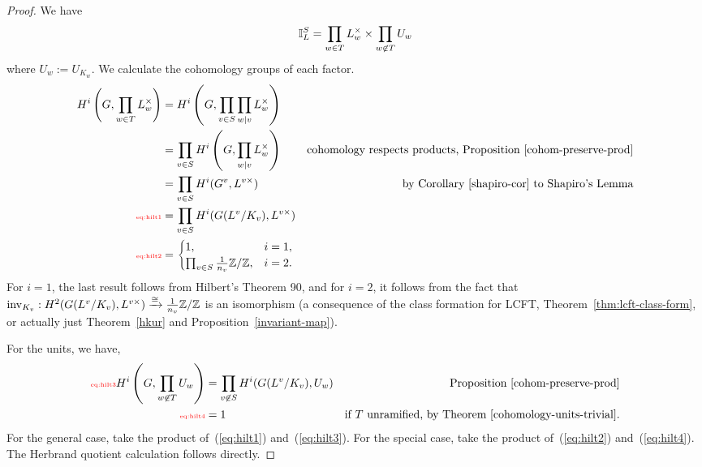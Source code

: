 \begin{proof}
We have
\begin{align*}
\mathbb{I}_L^S=\prod_{w\in T}L_w^{\times}\times  \prod_{w\not\in T} U_w
\end{align*}
where $U_w:=U_{K_w}$. %
We calculate the cohomology groups of each factor.
\begin{align}
\nonumber
H^i\pa{G,\prod_{w\in T}  L_w^{\times} }
&=H^i\pa{G,\prod_{v\in S}\prod_{w\mid v} L_w^{\times}}\\
\nonumber
&=\prod_{v\in S}H^i\pa{G,\prod_{w\mid v} L_w^{\times}}&\text{cohomology respects products, Proposition~\ref{cohom-preserve-prod}}\\
\nonumber
&=\prod_{v\in S}H^i(G^v,L^{v\times})&\text{by Corollary~\ref{shapiro-cor} to Shapiro's Lemma}\\
\llabel{eq:hilt1}
&=\prod_{v\in S}H^i(G(L^v/K_v),L^{v \times})\\
\llabel{eq:hilt2}
&=
\begin{cases}
1,&i=1,\\
\prod_{v\in S}\rc{n_v}\Z/\Z,&i=2.
\end{cases}
\end{align}
For $i=1$, the last result follows from Hilbert's Theorem 90, and for $i=2$, it follows from the fact that $\operatorname{inv}_{K_v}:H^2(G(L^v/K_v),L^{v\times})\xrightarrow{\cong} \frac{1}{n_v}\mathbb{Z}/\mathbb{Z}$ is an isomorphism (a consequence of the class formation for LCFT, Theorem~\ref{thm:lcft-class-form}, or actually just Theorem~\ref{hkur} and Proposition~\ref{invariant-map}).

For the units, we have, %
\begin{align}
\llabel{eq:hilt3}
H^i\pa{G,\prod_{w\nin T}  U_w }
&=\prod_{v\nin S}H^i(G(L^v/K_v),U_w)&\text{Proposition~\ref{cohom-preserve-prod}}\\
\llabel{eq:hilt4}
&=1&\text{if $T$ unramified, by Theorem~\ref{cohomology-units-trivial}.}
\end{align}
For the general case, take the product of~(\ref{eq:hilt1}) and~(\ref{eq:hilt3}). For the special case, take the product of~(\ref{eq:hilt2}) and~(\ref{eq:hilt4}). The Herbrand quotient calculation follows directly.
\end{proof}
